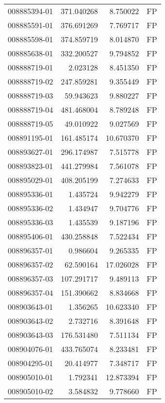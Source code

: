 \begin{tabular}{lrrl}
008885394-01 &  371.040268 &       8.750022 &   FP \\
008885591-01 &  376.691269 &       7.769717 &   FP \\
008885598-01 &  374.859719 &       8.014870 &   FP \\
008885638-01 &  332.200527 &       9.794852 &   FP \\
008888719-01 &    2.023128 &       8.451350 &   FP \\
008888719-02 &  247.859281 &       9.355449 &   FP \\
008888719-03 &   59.943623 &       9.880227 &   FP \\
008888719-04 &  481.468004 &       8.789248 &   FP \\
008888719-05 &   49.010922 &       9.027569 &   FP \\
008891195-01 &  161.485174 &      10.670370 &   FP \\
008893627-01 &  296.174987 &       7.515778 &   FP \\
008893823-01 &  441.279984 &       7.561078 &   FP \\
008895029-01 &  408.205199 &       7.274633 &   FP \\
008895336-01 &    1.435724 &       9.942279 &   FP \\
008895336-02 &    1.434947 &       9.704776 &   FP \\
008895336-03 &    1.435539 &       9.187196 &   FP \\
008895406-01 &  430.258848 &       7.522434 &   FP \\
008896357-01 &    0.986604 &       9.265335 &   FP \\
008896357-02 &   62.590164 &      17.026028 &   FP \\
008896357-03 &  107.291717 &       9.489113 &   FP \\
008896357-04 &  151.390662 &       8.834668 &   FP \\
008903643-01 &    1.356265 &      10.623340 &   FP \\
008903643-02 &    2.732716 &       8.391648 &   FP \\
008903643-03 &  176.531480 &       7.511134 &   FP \\
008904076-01 &  433.765074 &       8.233481 &   FP \\
008904295-01 &   20.414977 &       7.348717 &   FP \\
008905010-01 &    1.792341 &      12.873394 &   FP \\
008905010-02 &    3.584832 &       9.778660 &   FP \\

\end{tabular}
